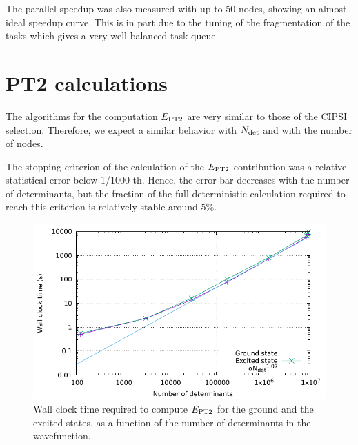 \documentclass[./thesis.tex]{subfiles}
\begin{document}
The parallel speedup was also measured with up to 50 nodes, showing an almost ideal speedup curve. This is in part due to the tuning of the fragmentation of the
tasks which gives a very well balanced task queue.

\clearpage

\section{PT2 calculations}

The algorithms for the computation $E_\text{PT2}$ are very similar to those of the CIPSI selection. Therefore, we expect a similar behavior with ${N_\text{det}}$ and with the number of nodes.

The stopping criterion of the calculation of the $E_\text{PT2}$ contribution was a
relative statistical error below 1/1000-th. Hence, the error bar decreases with
the number of determinants, but the fraction of the full deterministic
calculation required to reach this criterion is relatively stable around $5$\%.

\begin{figure}[h]
	\begin{center}
		\includegraphics[width=0.8\columnwidth]{figures/perf/scaling_pt2_det}
		\caption{Wall clock time required to compute $E_\text{PT2}$ for the ground and the excited states, as a function of the number of determinants in the wavefunction.}
		\label{fig:scaling_det_pt2}
	\end{center}
\end{figure}
\end{document}
